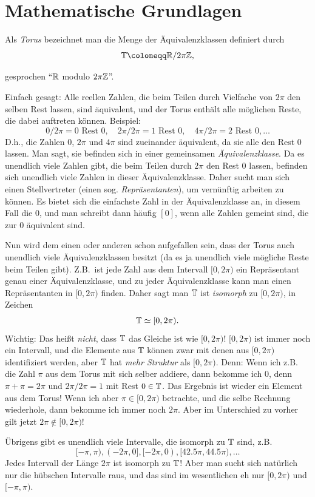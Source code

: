 \section{Mathematische Grundlagen}

\begin{definition}[Torus]
Als \emph{Torus} bezeichnet man die Menge der Äquivalenzklassen definiert durch
\[
  \T \coloneqq \R / 2\pi\Z,
\]

gesprochen \enquote{$ \mathbb{R} $ modulo $ 2\pi\mathbb{Z} $}.
\end{definition}

\begin{remark}[Torus]
Einfach gesagt: Alle reellen Zahlen, die beim Teilen durch Vielfache von $ 2\pi $ den selben Rest 
lassen, sind äquivalent, und der Torus enthält alle möglichen Reste, die dabei auftreten können. 
Beispiel:
\[
0 / 2\pi = 0 \text{ Rest } 0, \quad 
2\pi / 2\pi = 1 \text{ Rest } 0, \quad 
4\pi / 2\pi = 2 \text{ Rest } 0, \dots
\]
D.h., die Zahlen $ 0 $, $ 2\pi $ und $ 4\pi $ sind zueinander äquivalent, da sie alle den Rest $ 0 $
lassen. Man sagt, sie befinden sich in einer gemeinsamen \emph{Äquivalenzklasse}. Da es unendlich
viele Zahlen gibt, die beim Teilen durch $ 2\pi $ den Rest $ 0 $ lassen, befinden sich unendlich
viele Zahlen in dieser Äquivalenzklasse. Daher sucht man sich einen Stellvertreter (einen sog.
\emph{Repräsentanten}), um vernünftig arbeiten zu können. Es bietet sich die einfachste Zahl in der
Äquivalenzklasse an, in diesem Fall die $ 0 $, und man schreibt dann häufig $ [0] $, wenn alle 
Zahlen gemeint sind, die zur $ 0 $ äquivalent sind.

Nun wird dem einen oder anderen schon aufgefallen sein, dass der Torus auch unendlich viele 
Äquivalenzklassen besitzt (da es ja unendlich viele mögliche Reste beim Teilen gibt).
Z.B.\ ist jede Zahl aus dem Intervall $ [0, 2\pi) $ ein Repräsentant genau einer Äquivalenzklasse,
und zu jeder Äquivalenzklasse kann man einen Repräsentanten in $ [0, 2\pi) $ finden. Daher sagt man
$ \mathbb{T} $ ist \emph{isomorph} zu $ [0, 2\pi) $, in Zeichen
\[
  \mathbb{T} \simeq [0, 2\pi).
\]
Wichtig: Das heißt \emph{nicht}, dass $ \mathbb{T} $ das Gleiche ist wie $ [0, 2\pi) $! $ [0, 2\pi) $
ist immer noch ein Intervall, und die Elemente aus $ \mathbb{T} $ können zwar mit denen aus $ [0, 2\pi) $ 
identifiziert werden, aber $ \mathbb{T} $ hat \emph{mehr Struktur} als $ [0, 2\pi) $. Denn: Wenn ich z.B. 
die Zahl $ \pi $ aus dem Torus mit sich selber addiere, dann bekomme ich $ 0 $, denn
$ \pi + \pi = 2\pi $ und $ 2\pi / 2\pi = 1 $ mit Rest $ 0 \in \mathbb{T} $. Das Ergebnis ist wieder ein 
Element aus dem Torus! Wenn ich aber $ \pi \in [0, 2\pi) $ betrachte, und die selbe Rechnung
wiederhole, dann bekomme ich immer noch $ 2\pi $. Aber im Unterschied zu vorher gilt jetzt
$ 2\pi \notin [0, 2\pi) $!

Übrigens gibt es unendlich viele Intervalle, die isomorph zu $ \mathbb{T} $ sind, z.B.
\[
  [-\pi, \pi), (-2\pi, 0], [-2\pi, 0), [42.5\pi, 44.5\pi), \dots
\]
Jedes Intervall der Länge $ 2\pi $ ist isomorph zu $ \mathbb{T} $! Aber man sucht sich natürlich nur die
hübschen Intervalle raus, und das sind im wesentlichen eh nur $ [0, 2\pi) $ und $ [-\pi, \pi) $.
\end{remark}

